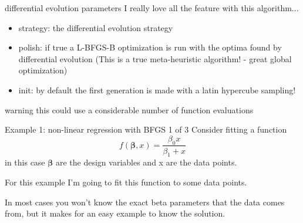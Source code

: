 \documentclass[10pt]{beamer}
\begin{document}

\begin{frame}{differential evolution parameters}
I really love all the feature with this algorithm... 
\begin{itemize}
\item strategy: the differential evolution strategy
\item polish: if true a L-BFGS-B optimization is run with the optima found by differential evolution (This is a true meta-heuristic algorithm! - great global optimization) 
\item init: by default the first generation is made with a latin hypercube sampling!
\end{itemize}
warning this could use a considerable number of function evaluations
\end{frame}

\begin{frame}{Example 1: non-linear regression with BFGS 1 of 3}
Consider fitting a function
\begin{equation}
f(\bm{\beta}, x) = \frac{\beta_0 x}{\beta_1 + x}
\end{equation}
in this case $\bm{\beta}$ are the design variables and x are the data points. 

For this example I'm going to fit this function to some data points. 

In most cases you won't know the exact beta parameters that the data comes from, but it makes for an easy example to know the solution.

\end{frame}

\end{document}
